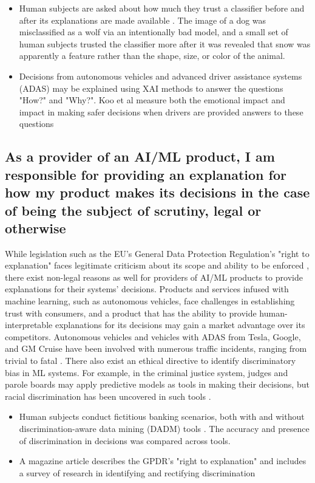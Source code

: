 \begin{itemize}
    \item Human subjects are asked about how much they trust a classifier before and after its explanations are made available \cite{Ribeiro:2016:WIT:2939672.2939778}.  The image of a dog was misclassified as a wolf via an intentionally bad model, and a small set of human subjects trusted the classifier more after it was revealed that snow was apparently a feature rather than the shape, size, or color of the animal.
    \item Decisions from autonomous vehicles and advanced driver assistance systems (ADAS) may be explained using XAI methods to answer the questions "How?" and "Why?".  Koo et al measure both the emotional impact and impact in making safer decisions when drivers are provided answers to these questions \cite{Koo2015}
\end{itemize}

\subsection{As a provider of an AI/ML product, I am responsible for providing an explanation for how my product makes its decisions in the case of being the subject of scrutiny, legal or otherwise}\label{subsec:UseCase3}

While legislation such as the EU's General Data Protection Regulation's "right to explanation" faces legitimate criticism about its scope and ability to be enforced \cite{Mittelstadt2017}, there exist non-legal reasons as well for providers of AI/ML products to provide explanations for their systems' decisions.  Products and services infused with machine learning, such as autonomous vehicles, face challenges in establishing trust with consumers, and a product that has the ability to provide human-interpretable explanations for its decisions may gain a market advantage over its competitors.  Autonomous vehicles and vehicles with ADAS from Tesla, Google, and GM Cruise have been involved with numerous traffic incidents, ranging from trivial to fatal \cite{Read2016} \cite{Tesla2018} \cite{Ackerman2016} \cite{Bhavsar2017}.  There also exist an ethical directive to identify discriminatory bias in ML systems.  For example, in the criminal justice system, judges and parole boards may apply predictive models as tools in making their decisions, but racial discrimination has been uncovered in such tools \cite{Wexler.2017} \cite{Angwin2016}.

\begin{itemize}
    \item Human subjects conduct fictitious banking scenarios, both with and without discrimination-aware data mining (DADM) tools \cite{Berendt2014}.  The accuracy and presence of discrimination in decisions was compared across tools.

    \item A magazine article describes the GPDR's "right to explanation" and includes a survey of research in identifying and rectifying discrimination \cite{Goodman2017EuropeanUR}
\end{itemize}

